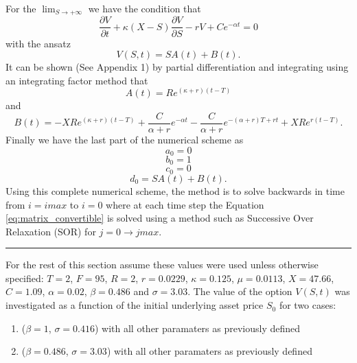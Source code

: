 \documentclass{article}
\begin{document}
For the \({\lim}_{S \to +\infty}\) we have the condition that
\begin{equation}
  \frac{\partial V}{\partial t} +\kappa(X -S)\frac{\partial V}{\partial S} -rV + Ce^{-\alpha t} =0
  \label{eq:large_s_boundary}
\end{equation}
with the ansatz
\begin{equation}
  V(S,t)=SA(t)+B(t).
  \label{eq:ansatz}
\end{equation}
It can be shown (See Appendix 1) by partial differentiation and integrating using an integrating factor method that
\begin{equation}
  A(t)=Re^{(\kappa+r)(t-T)}
  \label{eq:A}
\end{equation}
and\begin{equation}
  B(t)=-XRe^{(\kappa+r)(t-T)}+\frac{C}{\alpha+r}e^{-\alpha t}-\frac{C}{\alpha+r}e^{-(\alpha+r)T+rt}+XRe^{r(t-T)}.
  \label{eq:B}
\end{equation}
Finally we have the last part of the numerical scheme as
\begin{equation}
  a_0 = 0
  \label{eq:amax}
\end{equation}
\begin{equation}
  b_0 = 1
  \label{eq:bmax}
\end{equation}
\begin{equation}
  c_0 =0
  \label{eq:cmax}
\end{equation}
\begin{equation}
  d_0 = SA(t)+B(t).
  \label{eq:dmax}
\end{equation}
Using this complete numerical scheme, the method is to solve backwards in time from $i=imax$ to $i=0$ where at each time step the Equation \ref{eq:matrix_convertible} is solved using
a method such as Successive Over Relaxation (SOR) for $j=0\to jmax$.
\par\noindent\rule{\textwidth}{0.4pt}
For the rest of this section assume these values were used unless otherwise specified:
$T=2$, $F=95$, $R=2$, $r=0.0229$, $\kappa=0.125$, $\mu=0.0113$, $X=47.66$, $C=1.09$, $\alpha=0.02$, $\beta=0.486$ and $\sigma=3.03$.
The value of the option $V(S,t)$ was investigated as a function of the initial underlying asset
price $S_0$ for two cases:
\begin{enumerate}[1)]
  \item ($\beta=1$, $\sigma=0.416$) with all other paramaters as previously defined
  \item ($\beta=0.486$, $\sigma=3.03$) with all other paramaters as previously defined
\end{enumerate}
\end{document}
